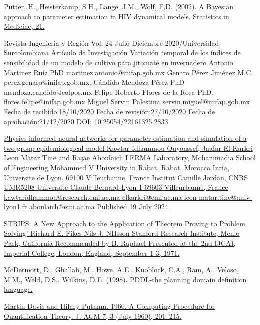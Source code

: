 \documentclass{article}
\begin{document}
\begin{itemize}
\begin{thebibliography}
    \bibitem[20]{}\href{https://www.semanticscholar.org/paper/A-Bayesian-approach-to-parameter-estimation-in-HIV-Putter-Heisterkamp/5eaa80435e642203bb1333011d1143a5b90577d2?utm_source=direct_link}{Putter, H., Heisterkamp, S.H., Lange, J.M.,  Wolf, F.D. (2002). A Bayesian approach to parameter estimation in HIV dynamical models. Statistics in Medicine, 21.}
    \label{sec:30}

    \bibitem[21]{}  Revista Ingeniería y Región Vol. 24 Julio-Diciembre 2020/Universidad Surcolombiana Artículo de Investigación Variación temporal de los índices de sensibilidad de un modelo de cultivo para jitomate en invernadero Antonio Martinez Ruíz PhD martinez.antonio@inifap.gob.mx Genaro Pérez Jiménez M.C. perez.genaro@inifap.gob.mx, Cándido Mendoza-Pérez PhD mendoza.candido@colpos.mx Felipe Roberto Flores-de la Rosa PhD. flores.felipe@inifap.gob.mx Miguel Servin Palestina servin.miguel@inifap.gob.mx Fecha de recibido:18/10/2020 Fecha de revisión:27/10/2020 Fecha de aprobación:21/12/2020 DOI: 10.25054/22161325.2833
    \label{sec:31}

    \bibitem[22]{} \href{https://theses.hal.science/INRIA/hal-04798230v1}{Physics-informed neural networks for parameter estimation and simulation of a two-group epidemiological model Kawtar Idhammou Ouyoussef, Jaafar El Karkri Leon Matar Tine and Rajae Aboulaich LERMA Laboratory, Mohammadia School of Engineering Mohammed V University in Rabat, Rabat, Morocco Inria, Universite de Lyon, 69100 Villeurbanne, France Institut Camille Jordan, CNRS UMR5208 Universite Claude Bernard Lyon 1 69603 Villeurbanne, France kawtaridhammou@research.emi.ac.ma elkarkri@emi.ac.ma leon-matar.tine@univ-lyon1.fr aboulaich@emi.ac.ma Published 19 July 2024}
    \label{sec:32}

    \bibitem[23]{} \href{https://ai.stanford.edu/~nilsson/OnlinePubs-Nils/PublishedPapers/strips.pdf}{STRIPS: A New Approach to the Application of Theorem Proving to Problem Solving' Richard E. Fikes Nils J. NHsson Stanford Research Institute, Menlo Park, California Recommended by B. Raphael Presented at the 2nd IJCAI, Imperial College, London, England, September 1-3, 1971.}
    \label{sec:33}

    \bibitem[24]{} \href{https://courses.cs.washington.edu/courses/cse473/06sp/pddl.pdf}{McDermott, D., Ghallab, M., Howe, A.E., Knoblock, C.A., Ram, A., Veloso, M.M., Weld, D.S., Wilkins, D.E. (1998). PDDL-the planning domain definition language.}
    \label{sec:34}

    \bibitem[25]{} \href{https://doi.org/10.1145/321033.321034}{Martin Davis and Hilary Putnam. 1960. A Computing Procedure for Quantification Theory. J. ACM 7, 3 (July 1960), 201–215.}
    \label{sec:35}


\end{thebibliography}
\end{itemize}
\end{document}
